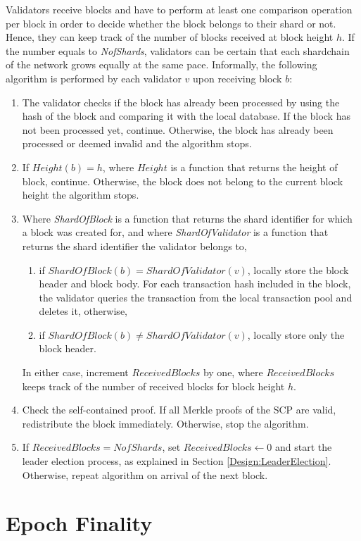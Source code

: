 Validators receive blocks and have to perform at least one comparison operation per block in order to decide whether the block belongs to their shard or not. Hence, they can keep track of the number of blocks received at block height $h$. If the number equals to \textit{NofShards}, validators can be certain that each shardchain of the network grows equally at the same pace. Informally, the following algorithm is performed by each validator $v$ upon receiving block $b$:
\begin{enumerate}
  \item The validator checks if the block has already been processed by using the hash of the block and comparing it with the local database. If the block has not been processed yet, continue. Otherwise, the block has already been processed or deemed invalid and the algorithm stops.
  \item If $Height(b) = h$, where $Height$ is a function that returns the height of block, continue. Otherwise, the block does not belong to the current block height the algorithm stops.
  \item Where \textit{ShardOfBlock} is a function that returns the shard identifier for which a block was created for, and where \textit{ShardOfValidator} is a function that returns the shard identifier the validator belongs to, 
    \begin{enumerate}
      \item if $ShardOfBlock(b) = ShardOfValidator(v)$, locally store the block header and block body. For each transaction hash included in the block, the validator queries the transaction from the local transaction pool and deletes it, otherwise,
      \item if $ShardOfBlock(b) \neq ShardOfValidator(v)$, locally store only the block header.
    \end{enumerate}
    In either case, increment $ReceivedBlocks$ by one, where $ReceivedBlocks$ keeps track of the number of received blocks for block height $h$.
  \item Check the self-contained proof. If all Merkle proofs of the SCP are valid, redistribute the block immediately. Otherwise, stop the algorithm.
  \item If $ReceivedBlocks = NofShards$, set $ReceivedBlocks \leftarrow 0$ and start the leader election process, as explained in Section \ref{Design:LeaderElection}. Otherwise, repeat algorithm on arrival of the next block.
\end{enumerate}

\section{Epoch Finality}
\label{Design:Finality}

